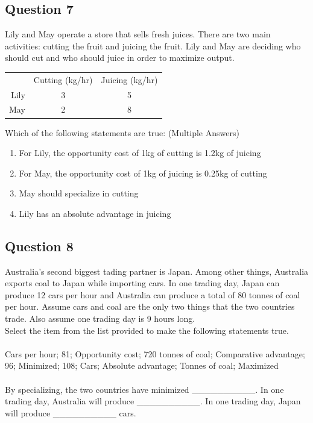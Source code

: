 \subsection{Question 7}
Lily and May operate a store that sells fresh juices. There are two main activities: cutting the fruit and juicing the fruit. Lily and May are deciding who should cut and who should juice in order to maximize output.
\begin{table}[H]
	\centering
	\begin{tabular}{r|c|c}
		& Cutting (kg/hr) & Juicing (kg/hr)\\\Xhline{1pt}
		Lily & 3 & 5\\\hline
		May & 2 & 8
	\end{tabular}
\end{table}
Which of the following statements are true: (Multiple Answers)
\begin{enumerate}
	\item For Lily, the opportunity cost of 1kg of cutting is 1.2kg of juicing
	\item For May, the opportunity cost of 1kg of juicing is 0.25kg of cutting
	\item May should specialize in cutting
	\item Lily has an absolute advantage in juicing
\end{enumerate}

\subsection{Question 8}
Australia's second biggest tading partner is Japan. Among other things, Australia exports coal to Japan while importing cars. In one trading day, Japan can produce 12 cars per hour and Australia can produce a total of 80 tonnes of coal per hour. Assume cars and coal are the only two things that the two countries trade. Also assume one trading day is 9 hours long.\\
Select the item from the list provided to make the following statements true.\\\\
Cars per hour; 81; Opportunity cost; 720 tonnes of coal; Comparative advantage; 96; Minimized; 108; Cars; Absolute advantage; Tonnes of coal; Maximized\\\\
By specializing, the two countries have minimized \_\_\_\_\_\_\_\_\_\_. In one trading day, Australia will produce \_\_\_\_\_\_\_\_\_\_. In one trading day, Japan will produce \_\_\_\_\_\_\_\_\_\_ cars.

